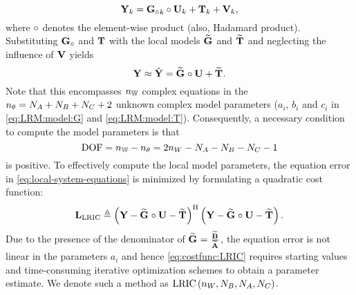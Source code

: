 \begin{equation}
  \mathbf{Y}_k  = {{\mathbf{G}}_{\circ}}_k \circ \mathbf{U}_k + \mathbf{T}_k + \mathbf{V}_k
\text{,}
\end{equation} 
where $\circ$ denotes the element-wise product (also, Hadamard product).
Substituting ${\mathbf{G}}_{\circ}$ and $\mathbf{T}$ with the local models $\mathbf{\widetilde{G}}_{} $ and $\mathbf{\widetilde{T}}_{} $ and neglecting the influence of $\mathbf{V}$ yields
\begin{equation}
  \mathbf{Y} 
  \approx 
  \hat{\mathbf{Y}} 
    =
      \mathbf{\widetilde{G}}_{}  \circ \mathbf{U} + \mathbf{\widetilde{T}}_{} 
      \text{.}
      \label{eq:local-system-equations}
\end{equation}
Note that this encompasses $n_{\mathbb{W}}$ complex equations in the $n_{\theta} = N_{A} + N_{B} + N_{C} + 2$  unknown complex model parameters ($a_i$, $b_i$ and $c_i$ in \eqref{eq:LRM:model:G} and \eqref{eq:LRM:model:T}).
Consequently, a necessary condition to compute the model parameters is that
\begin{equation}
  \mathrm{DOF} = n_{\mathbb{W}} - n_{\theta}
       = 2 n_{W} - N_{A} - N_{B} - N_{C} - 1
\end{equation}
is positive.
To effectively compute the local model parameters, the equation error in \eqref{eq:local-system-equations} is minimized by formulating a quadratic cost function:
\begin{equation}
  \mathbf{L_{\mathrm{LRIC}}} 
    \triangleq 
      \left( \mathbf{Y}  -  \mathbf{\widetilde{G}}_{}  \circ \mathbf{U} - \mathbf{\widetilde{T}}_{}  \right)^{\mathrm{H}} 
      \left( \mathbf{Y}  -  \mathbf{\widetilde{G}}_{}  \circ \mathbf{U} - \mathbf{\widetilde{T}}_{}  \right)
   \label{eq:costfunc:LRIC}
   \text{.}
\end{equation}
Due to the presence of the denominator of $\mathbf{\widetilde{G}}_{}  = \frac{\mathbf{\widetilde{B}}_{} }{\mathbf{\widetilde{A}}_{} }$, the equation error is not linear in the parameters $a_i$ and hence \eqref{eq:costfunc:LRIC} requires starting values and time-consuming iterative optimization schemes to obtain a parameter estimate.
We denote such a method as $\mathrm{LRIC} \left( n_{W},N_{B},N_{A},N_{C} \right) $.


